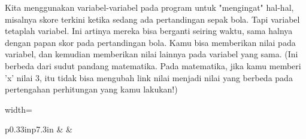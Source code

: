 

\vspace{12pt}
\noindent 
Kita menggunakan variabel-variabel pada program untuk "mengingat" hal-hal, misalnya skore terkini ketika sedang ada pertandingan sepak bola. Tapi variabel tetaplah $  $variabel. Ini artinya mereka bisa berganti seiring waktu, sama halnya dengan papan skor pada pertandingan bola. Kamu bisa memberikan nilai pada variabel, dan kemudian memberikan nilai lainnya pada variabel yang sama. (Ini berbeda dari sudut pandang matematika. Pada matematika, jika kamu memberi 'x' nilai 3, itu tidak bisa mengubah link nilai menjadi nilai yang berbeda pada pertengahan perhitungan yang kamu lakukan!) \par
\vspace{12pt}




\begin{table}[H]
\centering
\begin{adjustbox}{width=\textwidth}
\begin{tabular}{ p{0.33in}p{7.3in} }
\hhline{--}
 &  & \hline
\end{tabular}
\end{adjustbox}
\end{table}





